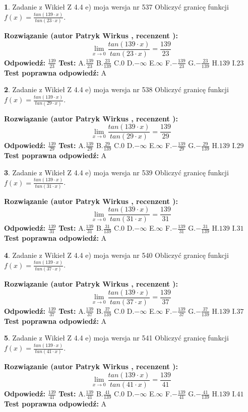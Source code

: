 \documentclass[12pt, a4paper]{article}
\theoremstyle{definition} %
\newtheorem{zad}{}
\newcommand{\zadStart}[1]{\begin{zad}#1\newline}
\newcommand{\zadStop}{\end{zad}}
\newcommand{\rozwStart}[2]{\noindent \textbf{Rozwiązanie (autor #1 , recenzent #2): }\newline}
\newcommand{\rozwStop}{\newline}
\newcommand{\odpStart}{\noindent \textbf{Odpowiedź:}\newline}
\newcommand{\odpStop}{\newline}
\newcommand{\testStart}{\noindent \textbf{Test:}\newline}
\newcommand{\testStop}{\newline}
\newcommand{\kluczStart}{\noindent \textbf{Test poprawna odpowiedź:}\newline}
\newcommand{\kluczStop}{\newline}
\begin{document}
\zadStart{Zadanie z Wikieł Z 4.4 e) moja wersja nr 537}
Obliczyć granicę funkcji $f(x)=\frac{tan(139\cdot x)}{tan(23\cdot x)}$.
\zadStop
\rozwStart{Patryk Wirkus}{}
$$\lim\limits_{x\to 0}\frac{tan(139\cdot x)}{tan(23\cdot x)}=
\frac{139}{23}$$
\rozwStop
\odpStart
$\frac{139}{23}$
\odpStop
\testStart
A.$\frac{139}{23}$
B.$\frac{23}{139}$
C.$0$
D.$-\infty$
E.$\infty$
F.$-\frac{139}{23}$
G.$-\frac{23}{139}$
H.$139$
I.$23$
\testStop
\kluczStart
A
\kluczStop



\zadStart{Zadanie z Wikieł Z 4.4 e) moja wersja nr 538}
Obliczyć granicę funkcji $f(x)=\frac{tan(139\cdot x)}{tan(29\cdot x)}$.
\zadStop
\rozwStart{Patryk Wirkus}{}
$$\lim\limits_{x\to 0}\frac{tan(139\cdot x)}{tan(29\cdot x)}=
\frac{139}{29}$$
\rozwStop
\odpStart
$\frac{139}{29}$
\odpStop
\testStart
A.$\frac{139}{29}$
B.$\frac{29}{139}$
C.$0$
D.$-\infty$
E.$\infty$
F.$-\frac{139}{29}$
G.$-\frac{29}{139}$
H.$139$
I.$29$
\testStop
\kluczStart
A
\kluczStop



\zadStart{Zadanie z Wikieł Z 4.4 e) moja wersja nr 539}
Obliczyć granicę funkcji $f(x)=\frac{tan(139\cdot x)}{tan(31\cdot x)}$.
\zadStop
\rozwStart{Patryk Wirkus}{}
$$\lim\limits_{x\to 0}\frac{tan(139\cdot x)}{tan(31\cdot x)}=
\frac{139}{31}$$
\rozwStop
\odpStart
$\frac{139}{31}$
\odpStop
\testStart
A.$\frac{139}{31}$
B.$\frac{31}{139}$
C.$0$
D.$-\infty$
E.$\infty$
F.$-\frac{139}{31}$
G.$-\frac{31}{139}$
H.$139$
I.$31$
\testStop
\kluczStart
A
\kluczStop



\zadStart{Zadanie z Wikieł Z 4.4 e) moja wersja nr 540}
Obliczyć granicę funkcji $f(x)=\frac{tan(139\cdot x)}{tan(37\cdot x)}$.
\zadStop
\rozwStart{Patryk Wirkus}{}
$$\lim\limits_{x\to 0}\frac{tan(139\cdot x)}{tan(37\cdot x)}=
\frac{139}{37}$$
\rozwStop
\odpStart
$\frac{139}{37}$
\odpStop
\testStart
A.$\frac{139}{37}$
B.$\frac{37}{139}$
C.$0$
D.$-\infty$
E.$\infty$
F.$-\frac{139}{37}$
G.$-\frac{37}{139}$
H.$139$
I.$37$
\testStop
\kluczStart
A
\kluczStop



\zadStart{Zadanie z Wikieł Z 4.4 e) moja wersja nr 541}
Obliczyć granicę funkcji $f(x)=\frac{tan(139\cdot x)}{tan(41\cdot x)}$.
\zadStop
\rozwStart{Patryk Wirkus}{}
$$\lim\limits_{x\to 0}\frac{tan(139\cdot x)}{tan(41\cdot x)}=
\frac{139}{41}$$
\rozwStop
\odpStart
$\frac{139}{41}$
\odpStop
\testStart
A.$\frac{139}{41}$
B.$\frac{41}{139}$
C.$0$
D.$-\infty$
E.$\infty$
F.$-\frac{139}{41}$
G.$-\frac{41}{139}$
H.$139$
I.$41$
\testStop
\kluczStart
A
\kluczStop
\end{document}
